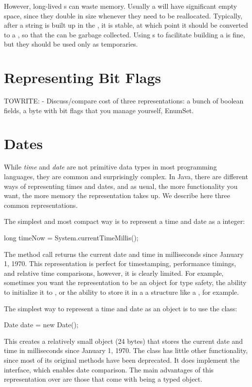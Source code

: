 However, long-lived s can waste memory. Usually a
 will have significant empty space, since they double in
size whenever they need to be reallocated. Typically, after a string is built up in the
, it is stable, at which point it should be converted 
to a , so that the  can be
garbage collected. Using s to facilitate
building a  is fine, but they should be used only as temporaries.

\section{Representing Bit Flags}
\label{sec:bit-flags}
TOWRITE:
- Discuss/compare cost of three representations: a bunch of boolean fields, a
byte with bit flags that you manage yourself, EnumSet.

\section{Dates}

While \textit{time} and \textit{date} are not primitive data types in most
programming languages, they are common and surprisingly complex. 
In Java, there are different ways of representing times and dates, and as
usual, the more functionality you want, the more memory the representation takes
up. We describe here three common representations.

The simplest and most compact way is to represent a time and date as a
 integer:
\begin{shortlisting}
    long timeNow = System.currentTimeMillis();
\end{shortlisting}
The method call  returns the current 
date and time in milliseconds since January 1, 1970.  This representation is
perfect for timestamping, performance timings, and relative time
comparisons, however, it is clearly limited. For example, sometimes you want the
representation to be an object for type safety, the ability to initialize it
to , or the ability to store it in a a structure like a
, for example.

The simplest way to represent a time and date as an object is to use the
 class:
\begin{shortlisting}
    Date date = new Date();
\end{shortlisting}
This creates a relatively small object (24 bytes) that stores the current date
and time in milliseconds since January 1, 1970. The class  has
little other functionality, since most of its original methods have been
deprecated. It does implement the  interface, which enables
date comparison. The main advantages of this representation over  are
those that come with being a typed object.



